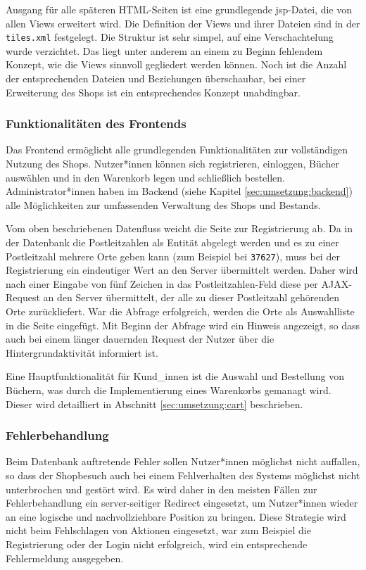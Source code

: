 		Ausgang für alle späteren HTML-Seiten ist eine grundlegende jsp-Datei, die von allen Views erweitert wird. Die Definition der Views und ihrer Dateien sind in der \lstinline|tiles.xml| festgelegt. Die Struktur ist sehr simpel, auf eine Verschachtelung wurde verzichtet. Das liegt unter anderem an einem zu Beginn fehlendem Konzept, wie die Views sinnvoll gegliedert werden können. Noch ist die Anzahl der entsprechenden Dateien und Beziehungen überschaubar, bei einer Erweiterung des Shops ist ein entsprechendes Konzept unabdingbar.
		
		\subsubsection{Funktionalitäten des Frontends}
		Das Frontend ermöglicht alle grundlegenden Funktionalitäten zur vollständigen Nutzung des Shops. Nutzer*innen können sich registrieren, einloggen, Bücher auswählen und in den Warenkorb legen und schließlich bestellen. Administrator*innen haben im Backend (siehe Kapitel \ref{sec:umsetzung:backend}) alle Möglichkeiten zur umfassenden Verwaltung des Shops und Bestands.
		
		Vom oben beschriebenen Datenfluss weicht die Seite zur Registrierung ab. Da in der Datenbank die Postleitzahlen als Entität abgelegt werden und es zu einer Postleitzahl mehrere Orte geben kann (zum Beispiel bei \lstinline|37627|), muss bei der Registrierung ein eindeutiger Wert an den Server übermittelt werden. Daher wird nach einer Eingabe von fünf Zeichen in das Postleitzahlen-Feld diese per AJAX-Request an den Server übermittelt, der alle zu dieser Postleitzahl gehörenden Orte zurückliefert. War die Abfrage erfolgreich, werden die Orte als Auswahlliste in die Seite eingefügt. Mit Beginn der Abfrage wird ein Hinweis angezeigt, so dass auch bei einem länger dauernden Request der Nutzer über die Hintergrundaktivität informiert ist.
		
		Eine Hauptfunktionalität für Kund\_innen ist die Auswahl und Bestellung von Büchern, was durch die Implementierung eines Warenkorbs gemanagt wird. Dieser wird detailliert in Abschnitt \ref{sec:umsetzung:cart} beschrieben.
		
		\subsubsection{Fehlerbehandlung}
		Beim Datenbank auftretende Fehler sollen Nutzer*innen möglichst nicht auffallen, so dass der Shopbesuch auch bei einem Fehlverhalten des Systems möglichst nicht unterbrochen und gestört wird. Es wird daher in den meisten Fällen zur Fehlerbehandlung ein server-seitiger Redirect eingesetzt, um Nutzer*innen wieder an eine logische und nachvollziehbare Position zu bringen. Diese Strategie wird nicht beim Fehlschlagen von Aktionen eingesetzt, war zum Beispiel die Registrierung oder der Login nicht erfolgreich, wird ein entsprechende Fehlermeldung ausgegeben.
		
